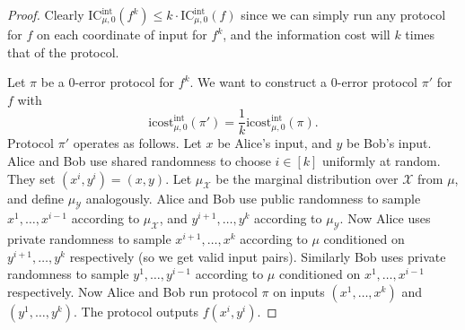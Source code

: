 \documentclass[11pt]{amsart}
\theoremstyle{plain}
\theoremstyle{definition}
\theoremstyle{plain}
\newcommand{\calX}{\mathcal{X}}
\newcommand{\calY}{\mathcal{Y}}
\newcommand{\ICint}{\mathrm{IC}^{\mathrm{int}}}
\newcommand{\icostint}{\mathrm{icost}^{\mathrm{int}}}
\begin{document}
\begin{proof}
Clearly $\ICint_{\mu,0}(f^k) \leq k \cdot \ICint_{\mu,0}(f)$ since we can simply run any protocol for $f$ on each coordinate of input for $f^k$, and the information cost will $k$ times that of the protocol.

Let $\pi$ be a $0$-error protocol for $f^k$. We want to construct a $0$-error protocol $\pi'$ for $f$ with
$$\icostint_{\mu,0}(\pi') = \frac{1}{k}\icostint_{\mu,0}(\pi).$$
Protocol $\pi'$ operates as follows. Let $x$ be Alice's input, and $y$ be Bob's input. Alice and Bob use shared randomness to choose $i \in [k]$ uniformly at random. They set $(x^i,y^i) = (x,y)$. Let $\mu_\calX$ be the marginal distribution over $\calX$ from $\mu$, and define $\mu_\calY$ analogously. Alice and Bob use public randomness to sample $x^1,\dots,x^{i-1}$ according to $\mu_\calX$, and $y^{i+1},\dots, y^k$ according to $\mu_\calY$. Now Alice uses private randomness to sample $x^{i+1}, \dots, x^{k}$ according to $\mu$ conditioned on $y^{i+1},\dots, y^k$ respectively (so we get valid input pairs). Similarly Bob uses private randomness to sample $y^{1}, \dots, y^{i-1}$ according to $\mu$ conditioned on $x^{1},\dots, x^{i-1}$ respectively. Now Alice and Bob run protocol $\pi$ on inputs $(x^1,\dots, x^k)$ and $(y^1,\dots, y^k)$. The protocol outputs $f(x^i,y^i)$.


\end{proof}
\end{document}
